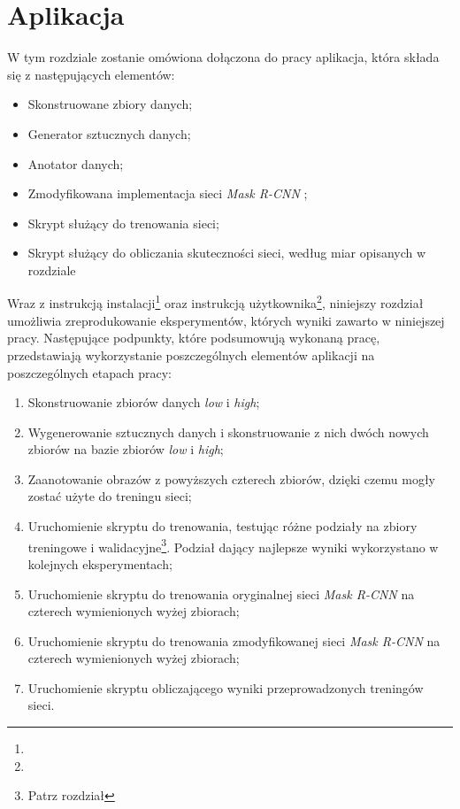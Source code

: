 \chapter{Aplikacja}
\label{sec:aplikacja}
W tym rozdziale zostanie omówiona dołączona do pracy aplikacja, która składa się z następujących elementów:
\begin{itemize}
  \item Skonstruowane zbiory danych;
  \item Generator sztucznych danych;
  \item Anotator danych;
  \item Zmodyfikowana implementacja sieci \textit{Mask R-CNN} \cite{matterport-mask-rcnn};
  \item Skrypt służący do trenowania sieci;
  \item Skrypt służący do obliczania skuteczności sieci, według miar opisanych w rozdziale 
\end{itemize}

Wraz z instrukcją instalacji\footnote{} oraz instrukcją użytkownika\footnote{}, niniejszy rozdział umożliwia zreprodukowanie eksperymentów, których wyniki zawarto w niniejszej pracy.
Następujące podpunkty, które podsumowują wykonaną pracę, przedstawiają wykorzystanie poszczególnych elementów aplikacji na poszczególnych etapach pracy:

\begin{enumerate}
 \item Skonstruowanie zbiorów danych \textit{low} i \textit{high};
 \item Wygenerowanie sztucznych danych i skonstruowanie z nich dwóch nowych zbiorów na bazie zbiorów \textit{low} i \textit{high};
 \item Zaanotowanie obrazów z powyższych czterech zbiorów, dzięki czemu mogły zostać użyte do treningu sieci;
 \item Uruchomienie skryptu do trenowania, testując różne podziały na zbiory treningowe i walidacyjne\footnote{Patrz rozdział }. Podział dający najlepsze wyniki wykorzystano w kolejnych eksperymentach;
 \item Uruchomienie skryptu do trenowania oryginalnej sieci \textit{Mask R-CNN} na czterech wymienionych wyżej zbiorach;
 \item Uruchomienie skryptu do trenowania zmodyfikowanej sieci \textit{Mask R-CNN} na czterech wymienionych wyżej zbiorach;
 \item Uruchomienie skryptu obliczającego wyniki przeprowadzonych treningów sieci.
\end{enumerate}



